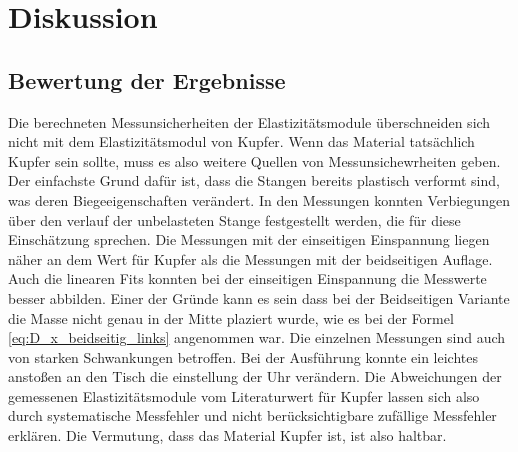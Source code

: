 
\section{Diskussion}


\subsection{Bewertung der Ergebnisse}
Die berechneten Messunsicherheiten der Elastizitätsmodule überschneiden sich nicht mit dem Elastizitätsmodul von Kupfer.
Wenn das Material tatsächlich Kupfer sein sollte, muss es also weitere Quellen von Messunsichewrheiten geben.
Der einfachste Grund dafür ist, dass die Stangen bereits plastisch verformt sind,
was deren Biegeeigenschaften verändert.
In den Messungen konnten Verbiegungen über den verlauf der unbelasteten Stange festgestellt werden,
 die für diese Einschätzung sprechen.
Die Messungen mit der einseitigen Einspannung liegen näher an dem Wert für Kupfer als die Messungen 
 mit der beidseitigen Auflage.
Auch die linearen Fits konnten bei der einseitigen Einspannung die Messwerte besser abbilden.
Einer der Gründe kann es sein dass bei der Beidseitigen Variante die Masse nicht
genau in der Mitte plaziert wurde, wie es bei der Formel \eqref{eq:D_x_beidseitig_links} angenommen war.
Die einzelnen Messungen sind auch von starken Schwankungen betroffen.
Bei der Ausführung konnte ein leichtes anstoßen an den Tisch die einstellung der Uhr verändern.
Die Abweichungen der gemessenen Elastizitätsmodule vom Literaturwert für Kupfer lassen sich also durch
systematische Messfehler und nicht berücksichtigbare zufällige Messfehler erklären.
Die Vermutung, dass das Material Kupfer ist, ist also haltbar.

